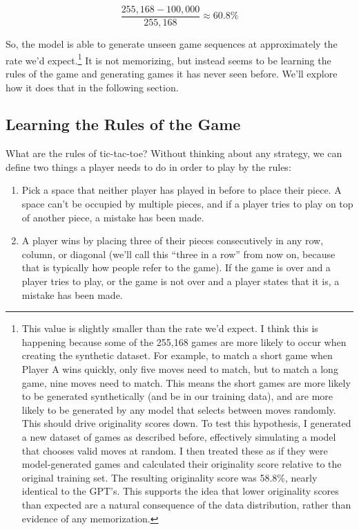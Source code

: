 \documentclass[11pt]{article}
\begin{document}
\[
\frac{255,\!168 - 100,\!000}{255,\!168} \approx 60.8\%
\]

    So, the model is able to generate unseen game sequences at approximately
the rate we'd expect.\footnote{This value is slightly smaller than the rate we'd expect. I
think this is happening because some of the 255,168 games are more
likely to occur when creating the synthetic dataset. For example, to
match a short game when Player A wins quickly, only five moves need to
match, but to match a long game, nine moves need to match. This means
the short games are more likely to be generated synthetically (and be in
our training data), and are more likely to be generated by any model
that selects between moves randomly. This should drive originality
scores down. To test this hypothesis, I generated a new dataset of games
as described before, effectively simulating a model that chooses valid
moves at random. I then treated these as if they were model-generated
games and calculated their originality score relative to the original
training set. The resulting originality score was 58.8\%, nearly
identical to the GPT's. This supports the idea that lower originality
scores than expected are a natural consequence of the data distribution,
rather than evidence of any memorization.} It is not memorizing, but instead seems
to be learning the rules of the game and generating games it has never
seen before. We'll explore how it does that in the following section.

    \subsection{Learning the Rules of the
Game}\label{learning-the-rules-of-the-game}

What are the rules of tic-tac-toe? Without thinking about any strategy,
we can define two things a player needs to do in order to play by the
rules:

\begin{enumerate}
\def\labelenumi{\arabic{enumi}.}
\item
  Pick a space that neither player has played in before to place their
  piece. A space can't be occupied by multiple pieces, and if a player
  tries to play on top of another piece, a mistake has been made.
\item
  A player wins by placing three of their pieces consecutively in any
  row, column, or diagonal (we'll call this ``three in a row'' from now
  on, because that is typically how people refer to the game). If the
  game is over and a player tries to play, or the game is not over and a
  player states that it is, a mistake has been made.
\end{enumerate}
\end{document}
